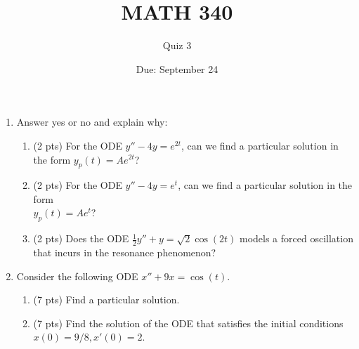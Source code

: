 \documentclass{article}
\begin{document}
\title{MATH 340}
\author{Quiz 3}
\date{Due: September 24}
\maketitle

\begin{enumerate}
	\item Answer yes or no and explain why:
\begin{enumerate}
	\item (2 pts) For the ODE $y''-4y=e^{2t}$, can we find a particular
		solution in the form $y_p(t)=Ae^{2t}$?
		\vspace{5cm}
	\item (2 pts) For the ODE $y''-4y=e^t$, can we find a particular
	solution in the form \\ $y_p(t)=Ae^t$?
		\vspace{5cm}
	\item (2 pts) Does the ODE $\frac{1}{2}y''+y=\sqrt{2}\cos(2t)$ models a forced oscillation that incurs in the resonance phenomenon?
\end{enumerate}
	\newpage
	\item Consider the following ODE $x''+9x=\cos(t)$.
\begin{enumerate}
	\item (7 pts) Find a particular solution.
		\vspace{10cm}
	\item (7 pts) Find the solution of the ODE that satisfies the initial
		conditions\\ $x(0)=9/8,x'(0)=2$.
\end{enumerate}
\end{enumerate}
\end{document}
